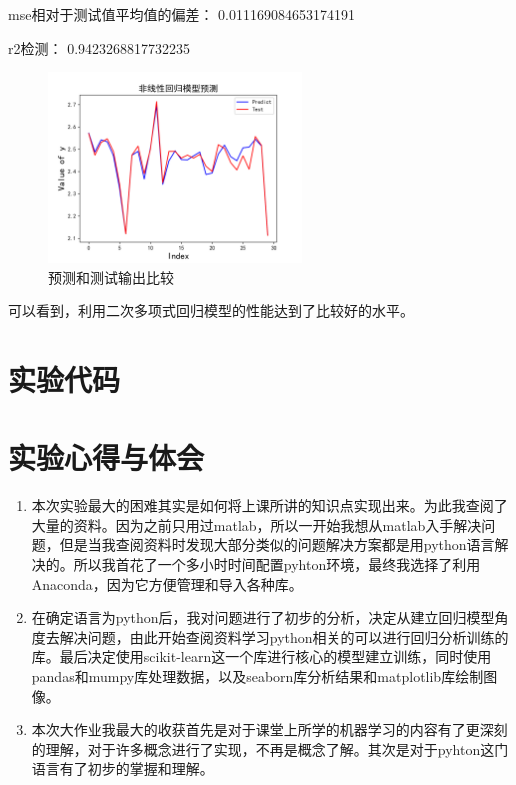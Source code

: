 \documentclass{source/Experiment}
\begin{document}
mse相对于测试值平均值的偏差： 0.011169084653174191

r2检测： 0.9423268817732235

\begin{figure}[H]
    \centering
    \includegraphics[width = 0.6\textwidth]{LinearR2}
    \caption{预测和测试输出比较}
\end{figure}

可以看到，利用二次多项式回归模型的性能达到了比较好的水平。
\section{实验代码}

\section{实验心得与体会}
\begin{enumerate}
    \item 本次实验最大的困难其实是如何将上课所讲的知识点实现出来。为此我查阅了大量的资料。因为之前只用过matlab，所以一开始我想从matlab入手解决问题，但是当我查阅资料时发现大部分类似的问题解决方案都是用python语言解决的。所以我首花了一个多小时时间配置pyhton环境，最终我选择了利用Anaconda，因为它方便管理和导入各种库。
    \item 在确定语言为python后，我对问题进行了初步的分析，决定从建立回归模型角度去解决问题，由此开始查阅资料学习python相关的可以进行回归分析训练的库。最后决定使用scikit-learn这一个库进行核心的模型建立训练，同时使用pandas和mumpy库处理数据，以及seaborn库分析结果和matplotlib库绘制图像。
    \item 本次大作业我最大的收获首先是对于课堂上所学的机器学习的内容有了更深刻的理解，对于许多概念进行了实现，不再是概念了解。其次是对于pyhton这门语言有了初步的掌握和理解。
\end{enumerate}
\end{document}
